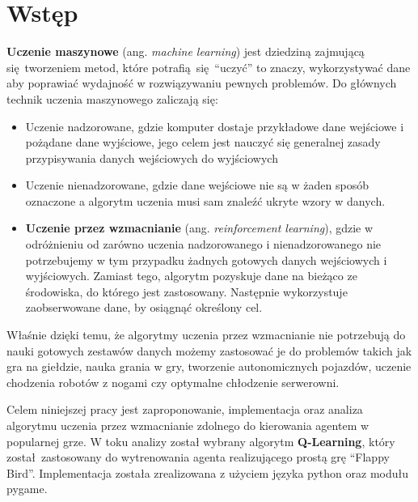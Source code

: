 \documentclass[a4paper, 12pt,oneside]{book}
\newcommand\chap[1]{%
  \chapter*{#1}%
  \addcontentsline{toc}{chapter}{#1}}
\begin{document}
\sloppy
\thispagestyle{empty}

\newpage{}

\thispagestyle{empty}
\newpage{}

\tableofcontents{}
\newpage


\chap{Wstęp}
\textbf{Uczenie maszynowe} (ang. \textit{machine learning}) jest dziedziną
zajmującą się tworzeniem metod, które potrafią się ``uczyć'' to znaczy,
wykorzystywać dane aby poprawiać wydajność w rozwiązywaniu pewnych
problemów\cite{machine_learning_definition}.
Do głównych technik uczenia maszynowego zaliczają się:
\begin{itemize}
	\setlength\itemsep{-0.4em}
\item Uczenie nadzorowane, gdzie komputer dostaje przykładowe dane wejściowe i
	pożądane dane wyjściowe, jego celem jest nauczyć się generalnej zasady
	przypisywania danych wejściowych do wyjściowych
\item Uczenie nienadzorowane, gdzie dane wejściowe nie są w żaden sposób
	oznaczone a algorytm uczenia musi sam znaleźć ukryte wzory w danych.
\item \textbf{Uczenie przez wzmacnianie}
	(ang. \textit{reinforcement learning}), gdzie w odróżnieniu od zarówno
	uczenia 
	nadzorowanego i nienadzorowanego nie potrzebujemy w tym przypadku
	żadnych	gotowych danych wejściowych i wyjściowych. Zamiast tego,
	algorytm pozyskuje dane na bieżąco ze środowiska, do którego jest
	zastosowany. Następnie wykorzystuje zaobserwowane dane, by osiągnąć
	określony cel.
\end{itemize}

Właśnie dzięki temu, że algorytmy uczenia przez wzmacnianie nie potrzebują do
nauki gotowych
zestawów danych możemy zastosować je do problemów takich jak gra na
giełdzie\cite{trading_reinforcement}, nauka grania w gry, tworzenie
autonomicznych pojazdów, uczenie chodzenia robotów z nogami czy optymalne
chłodzenie serwerowni\cite{reinforcement_applications}.

Celem niniejszej pracy jest zaproponowanie, implementacja oraz analiza
algorytmu uczenia przez wzmacnianie zdolnego do kierowania agentem w popularnej
grze. W toku analizy został wybrany algorytm \textbf{Q-Learning}, który
został zastosowany do wytrenowania agenta realizującego prostą grę ``Flappy
Bird''. Implementacja została zrealizowana z użyciem języka python oraz modułu
pygame.
\end{document}
